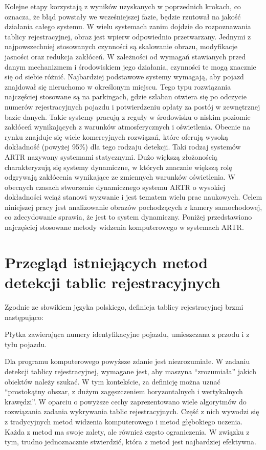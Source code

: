 \FloatBarrier
Kolejne etapy korzystają z wyników uzyskanych w poprzednich krokach, co oznacza, że błąd powstały we wcześniejszej fazie, będzie rzutował na jakość działania całego systemu.
W wielu systemach zanim dojdzie do rozpoznawania tablicy rejestracyjnej, obraz jest wpierw odpowiednio przetwarzany.
Jednymi z najpowszechniej stosowanych czynności są skalowanie obrazu, modyfikacje jasności oraz redukcja zakłóceń.
W zależności od wymagań stawianych przed danym mechanizmem i środowiskiem jego działania, czynności te mogą znacznie się od siebie różnić.
Najbardziej podstawowe systemy wymagają, aby pojazd znajdował się nieruchomo w określonym miejscu.
Tego typu rozwiązania najczęściej stosowane są na parkingach, gdzie szlaban otwiera się po odczycie numerów rejestracyjnych pojazdu i potwierdzeniu opłaty za postój w zewnętrznej bazie danych.
Takie systemy pracują z reguły w środowisku o niskim poziomie zakłóceń wynikających z warunków atmosferycznych i oświetlenia.
Obecnie na rynku znajduje się wiele komercyjnych rozwiązań, które oferują wysoką dokładność (powyżej 95\%) dla tego rodzaju detekcji.
Taki rodzaj systemów ARTR nazywany systemami statycznymi.
Dużo większą złożonością charakteryzują się systemy dynamiczne, w których znacznie większą rolę odgrywają zakłócenia wynikające ze zmiennych warunków oświetlenia.
W obecnych czasach stworzenie dynamicznego systemu ARTR o wysokiej dokładności wciąż stanowi wyzwanie i jest tematem wielu prac naukowych.
Celem niniejszej pracy jest analizowanie obrazów pochodzących z kamery samochodowej, co zdecydowanie sprawia, że jest to system dynamiczny.
Poniżej przedstawiono najczęściej stosowane metody widzenia komputerowego w systemach ARTR.


\section{Przegląd istniejących metod detekcji tablic rejestracyjnych}

Zgodnie ze słowikiem języka polskiego, definicja tablicy rejestracyjnej brzmi następująco:
\begin{definition}
    Płytka zawierająca numery identyfikacyjne pojazdu, umieszczana z przodu i z tyłu pojazdu.
\end{definition}
Dla programu komputerowego powyższe zdanie jest niezrozumiałe.
W zadaniu detekcji tablicy rejestracyjnej, wymagane jest, aby maszyna ``zrozumiała'' jakich obiektów należy szukać.
W tym kontekście, za definicję można uznać ``prostokątny obszar, z dużym zagęszczeniem horyzontalnych i wertykalnych krawędzi''\cite{824138}.
W oparciu o powyższe cechy zaprezentowano wiele algorytmów do rozwiązania zadania wykrywania tablic rejestracyjnych.
Część z nich wywodzi się z tradycyjnych metod widzenia komputerowego i metod głębokiego uczenia.
Każda z metod ma swoje zalety, ale również często ograniczenia.
W związku z tym, trudno jednoznacznie stwierdzić, która z metod jest najbardziej efektywna.


